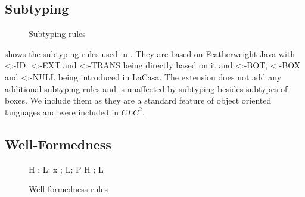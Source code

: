 \subsection{Subtyping}
\begin{figure}
\vspace{3mm}

\vspace{3mm}

\vspace{3mm}

\vspace{3mm}

\vspace{3mm}

\vspace{3mm}
    \caption{Subtyping rules}
    \label{fig:subtyping}
\end{figure}
 shows the subtyping rules used in \plc. They are based on Featherweight Java with \textless:-ID, \textless:-EXT and \textless:-TRANS being directly based on it and \textless:-BOT, \textless:-BOX and \textless:-NULL being introduced in LaCasa. The \plc extension does not add any additional subtyping rules and is unaffected by subtyping besides subtypes of boxes. We include them as they are a standard feature of object oriented languages and were included in $CLC^2$.


\subsection{Well-Formedness}

\begin{figure}
\vspace{3mm}
    {H \vdash \Gamma ; L; x}
\vspace{3mm}
    {\vdash \Gamma; L; P}
\vspace{3mm}
    {H \vdash \Gamma; L}
    
    \caption{Well-formedness rules}
    \label{fig:wellformedness}
\end{figure}

